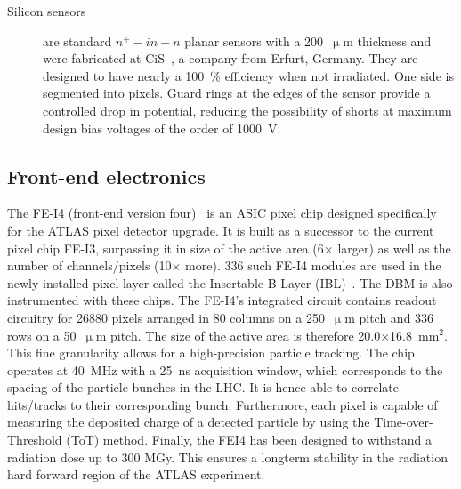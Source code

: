 \begin{description}
\begin{figure}[!t]
\label{fig:wafer}
\end{figure}
\item[Silicon sensors] are standard $n^+ - in - n$ planar sensors with a 200~$\upmu$m thickness and were fabricated at CiS~\cite{CIS:00000}, a company from Erfurt, Germany. They are designed to have nearly a 100~\% efficiency when not irradiated. 
One side is segmented into pixels. Guard rings at the edges of the sensor provide a controlled drop in potential, reducing the possibility of shorts at maximum design bias voltages of the order of 1000~V.
\end{description}



\subsection{Front-end electronics}
The FE-I4 (front-end version four)~\cite{Albert:1477014} is an ASIC pixel chip designed specifically for the ATLAS pixel detector upgrade. It is built as a successor to the current pixel chip FE-I3, surpassing it in size of the active area (6$\times$ larger) as well as the number of channels/pixels (10$\times$ more). 336 such FE-I4 modules are used in the newly installed pixel layer called the Insertable B-Layer (IBL)~\cite{Huegging:1314083}. The DBM is also instrumented with these chips. The FE-I4's integrated circuit contains readout circuitry for 26880 pixels arranged in 80 columns on a 250~$\upmu$m pitch and 336 rows on a 50~$\upmu$m pitch. The size of the active area is therefore 20.0$\times$16.8~mm$^2$. This fine granularity allows for a high-precision particle tracking. The chip operates at 40~MHz with a 25~ns acquisition window, which corresponds to the spacing of the particle bunches in the LHC. It is hence able to correlate hits/tracks to their corresponding bunch. Furthermore, each pixel is capable of measuring the deposited charge of a detected particle by using the Time-over-Threshold (ToT) method. Finally, the FEI4 has been designed to withstand a radiation dose up to 300 MGy. This ensures a longterm stability in the radiation hard forward region of the ATLAS experiment.

